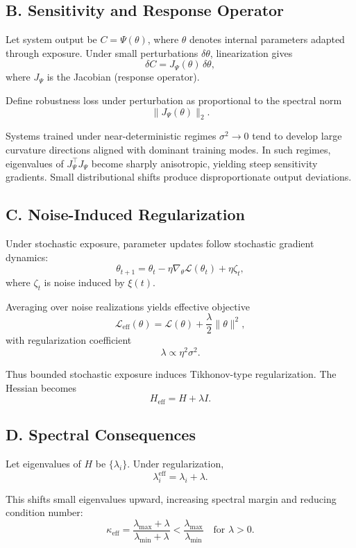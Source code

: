 \documentclass[11pt]{article}
\theoremstyle{remark}
\begin{document}
\subsection*{B. Sensitivity and Response Operator}

Let system output be $C = \Psi(\theta)$, where $\theta$ denotes internal parameters adapted through exposure. Under small perturbations $\delta \theta$, linearization gives
\[
\delta C = J_\Psi(\theta)\,\delta \theta,
\]
where $J_\Psi$ is the Jacobian (response operator).

Define robustness loss under perturbation as proportional to the spectral norm
\[
\|J_\Psi(\theta)\|_2.
\]

Systems trained under near-deterministic regimes $\sigma^2 \to 0$ tend to develop large curvature directions aligned with dominant training modes. In such regimes, eigenvalues of $J_\Psi^\top J_\Psi$ become sharply anisotropic, yielding steep sensitivity gradients. Small distributional shifts produce disproportionate output deviations.

\subsection*{C. Noise-Induced Regularization}

Under stochastic exposure, parameter updates follow stochastic gradient dynamics:
\[
\theta_{t+1}
=
\theta_t
-
\eta \nabla_\theta \mathcal{L}(\theta_t)
+
\eta \zeta_t,
\]
where $\zeta_t$ is noise induced by $\xi(t)$.

Averaging over noise realizations yields effective objective
\[
\mathcal{L}_{\text{eff}}(\theta)
=
\mathcal{L}(\theta)
+
\frac{\lambda}{2} \|\theta\|^2,
\]
with regularization coefficient
\[
\lambda \propto \eta^2 \sigma^2.
\]

Thus bounded stochastic exposure induces Tikhonov-type regularization. The Hessian becomes
\[
H_{\text{eff}}
=
H
+
\lambda I.
\]

\subsection*{D. Spectral Consequences}

Let eigenvalues of $H$ be $\{\lambda_i\}$. Under regularization,
\[
\lambda_i^{\text{eff}} = \lambda_i + \lambda.
\]

This shifts small eigenvalues upward, increasing spectral margin and reducing condition number:
\[
\kappa_{\text{eff}}
=
\frac{\lambda_{\max} + \lambda}{\lambda_{\min} + \lambda}
<
\frac{\lambda_{\max}}{\lambda_{\min}}
\quad \text{for } \lambda > 0.
\]
\end{document}
